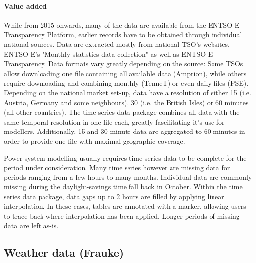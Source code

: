 \documentclass[article]{elsarticle}
\begin{document}
\paragraph{Value added}
While from 2015 onwards, many of the data are available from the ENTSO-E Transparency Platform, earlier records have to be obtained through individual national sources. Data are extracted mostly from national TSO's websites, ENTSO-E's "Monthly statistics data collection" as well as ENTSO-E Transparency. Data formats vary greatly depending on the source: Some TSOs allow downloading one file containing all available data (Amprion), while others require downloading and combining monthly (TenneT) or even daily files (PSE). Depending on the national market set-up, data have a resolution of either 15 (i.e. Austria, Germany and some neighbours), 30 (i.e. the British Isles) or 60 minutes (all other countries). The time series data package combines all data with the same temporal resolution in one file each, greatly fascilitating it's use for modellers. Additionally, 15 and 30 minute data are aggregated to 60 minutes in order to provide one file with maximal geographic coverage.

Power system modelling usually requires time series data to be complete for the period under consideration. Many time series however are missing data for periods ranging from a few hours to many months. Individual data are commonly missing during the daylight-savings time fall back in October. Within the time series data package, data gaps up to 2 hours are filled by applying linear interpolation. In these cases, tables are annotated with a marker, allowing users to trace back where interpolation has been applied. Longer periods of missing data are left as-is.

\subsection{Weather data (Frauke)}
\end{document}

